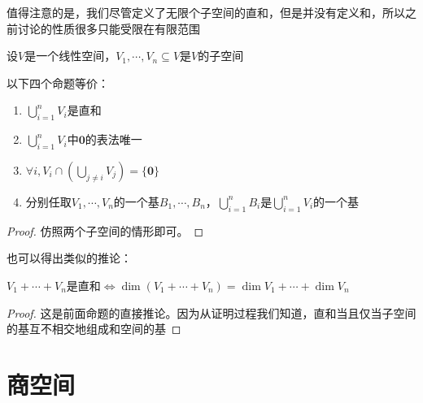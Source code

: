 \documentclass[12pt, a4paper, oneside, UTF8]{ctexbook}
\begin{document}
\begin{para}{0}
					值得注意的是，我们尽管定义了无限个子空间的直和，但是并没有定义和，所以之前讨论的性质很多只能受限在有限范围
				\point{}
					\begin{proposition}
						设$V$是一个线性空间，$V_1,\cdots,V_n \subseteq V$是$V$的子空间

						以下四个命题等价：

						\begin{enumerate}
							\item $\bigcup\limits_{i=1}^{n} V_i$是直和
							\item $\bigcup\limits_{i=1}^{n} V_i$中$\mathbf{0}$的表法唯一
							\item $\forall i,V_i \cap (\bigcup\limits_{j\neq i} V_j) = \{\mathbf{0}\}$
							\item 分别任取$V_1,\cdots,V_n$的一个基$B_1,\cdots,B_n$，$\bigcup\limits_{i=1}^{n} B_i$是$\bigcup\limits_{i=1}^{n} V_i$的一个基
						\end{enumerate}
					\end{proposition}
					\begin{proof}
						仿照两个子空间的情形即可。
					\end{proof}
					也可以得出类似的推论：
					\begin{corollary}{}{}
						$V_1 + \cdots + V_n$是直和$\Leftrightarrow \dim (V_1+\cdots+V_n)=\dim V_1 + \cdots + \dim V_n$
					\end{corollary}
					\begin{proof}
						这是前面命题的直接推论。因为从证明过程我们知道，直和当且仅当子空间的基互不相交地组成和空间的基
					\end{proof}
			\end{para}
	\section{商空间}
\end{document}
